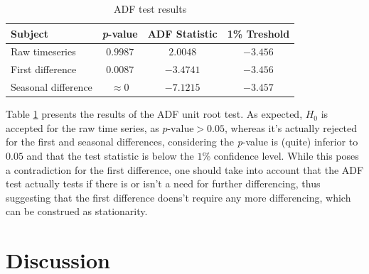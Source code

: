 \documentclass[conference]{IEEEtran}
\begin{document}
\begin{table}[btp]
    \caption{ADF test results}
    \centering
    \begin{tabular}{l|c|c||c}
        Subject & \textit{p}-value & ADF Statistic & 1\% Treshold  \\
        \hline
        Raw timeseries & $0.9987$  &  $2.0048$ & $-3.456$ \\
        First difference & \cellcolor{green!25} $0.0087$ & $-3.4741$ & $-3.456$ \\
        Seasonal difference & \cellcolor{green!25} $\approx 0$ & $-7.1215$ & $-3.457$ \\
    \end{tabular}
    \label{tab:adfuller}
\end{table}

Table \ref{tab:adfuller} presents the results of the ADF unit root test. As expected, $H_0$ is accepted for the raw time series, as $p\text{-value}>0.05$, whereas it's actually rejected for the first and seasonal differences, considering the \textit{p}-value is (quite) inferior to $0.05$ and that the test statistic is below the $1\%$ confidence level. While this poses a contradiction for the first difference, one should take into account that the ADF test actually tests if there is or isn't a need for further differencing, thus suggesting that the first difference doens't require any more differencing, which can be construed as stationarity.

\section{Discussion}

%
%
\end{document}
